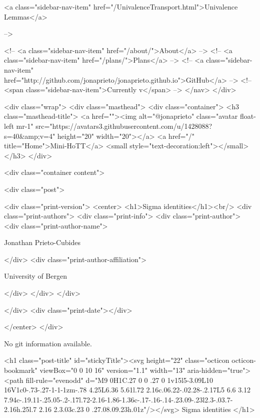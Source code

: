       
    
      
        
          <a class="sidebar-nav-item" href="/UnivalenceTransport.html">Univalence Lemmas</a>
        
      
     -->

    <!-- <a class="sidebar-nav-item" href="/about/">About</a> -->
    <!-- <a class="sidebar-nav-item" href="/plans/">Plans</a> -->
    <!-- <a class="sidebar-nav-item" href="http://github.com/jonaprieto/jonaprieto.github.io">GitHub</a> -->
    <!-- <span class="sidebar-nav-item">Currently v</span> -->
  </nav>
</div>

    <div class="wrap">
      <div class="masthead">
        <div class="container">
          <h3 class="masthead-title">
            <a href=""><img alt="@jonaprieto" class="avatar float-left mr-1" src="https://avatars3.githubusercontent.com/u/1428088?s=40&amp;v=4" height="20" width="20"></a>
            <a href="/" title="Home">Mini-HoTT</a>
            <small style="text-decoration:left"></small>
          </h3>
        </div>
      
      <div class="container content">
        







<div class="post">

  <div class="print-version">
    <center>
      <h1>Sigma identities</h1><br/>
        <div class="print-authors">
          <div class="print-info">
            <div class="print-author">
              <div class="print-author-name">
                
                  Jonathan Prieto-Cubides
                
              </div>
              <div class="print-author-affiliation">
                
                  University of Bergen
                
                </div>
            </div>
          </div>
          
          
        </div>
        <div class="print-date"></div>
        
        
    </center>
  </div>

  
  No git information available.
  
  <h1 class="post-title" id="stickyTitle"><svg height="22" class="octicon octicon-bookmark" viewBox="0 0 10 16" version="1.1" width="13" aria-hidden="true"><path fill-rule="evenodd" d="M9 0H1C.27 0 0 .27 0 1v15l5-3.09L10 16V1c0-.73-.27-1-1-1zm-.78 4.25L6.36 5.61l.72 2.16c.06.22-.02.28-.2.17L5 6.6 3.12 7.94c-.19.11-.25.05-.2-.17l.72-2.16-1.86-1.36c-.17-.16-.14-.23.09-.23l2.3-.03.7-2.16h.25l.7 2.16 2.3.03c.23 0 .27.08.09.23h.01z"/></svg> Sigma identities
  </h1>

